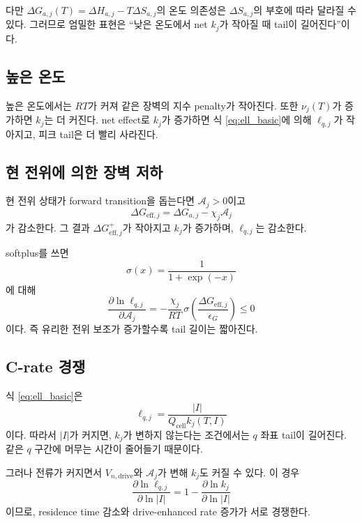 \documentclass[11pt]{article}
\newcommand{\cell}{\mathrm{cell}}
\newcommand{\drive}{\mathrm{drive}}
\newcommand{\eff}{\mathrm{eff}}
\begin{document}
다만 \(\Delta G_{a,j}(T)=\Delta H_{a,j}-T\Delta S_{a,j}\)의 온도 의존성은 \(\Delta S_{a,j}\)의 부호에 따라 달라질 수 있다. 그러므로 엄밀한 표현은 ``낮은 온도에서 net \(k_j\)가 작아질 때 tail이 길어진다''이다.

\subsection{높은 온도}

높은 온도에서는 \(RT\)가 커져 같은 장벽의 지수 penalty가 작아진다. 또한 \(\nu_j(T)\)가 증가하면 \(k_j\)는 더 커진다. net effect로 \(k_j\)가 증가하면 식 \eqref{eq:ell_basic}에 의해 \(\ell_{q,j}\)가 작아지고, 피크 tail은 더 빨리 사라진다.

\subsection{현 전위에 의한 장벽 저하}

현 전위 상태가 forward transition을 돕는다면 \(\mathcal A_j>0\)이고
\begin{equation}
\Delta G_{\eff,j}
=
\Delta G_{a,j}
-
\chi_j\mathcal A_j
\end{equation}
가 감소한다. 그 결과 \(\Delta G_{\eff,j}^{+}\)가 작아지고 \(k_j\)가 증가하며, \(\ell_{q,j}\)는 감소한다.

softplus를 쓰면
\begin{equation}
\sigma(x)
=
\frac{1}{1+\exp(-x)}
\end{equation}
에 대해
\begin{equation}
\boxed{
\frac{\partial \ln \ell_{q,j}}{\partial \mathcal A_j}
=
-
\frac{\chi_j}{RT}
\,\sigma\!\left(
\frac{\Delta G_{\eff,j}}{\epsilon_G}
\right)
\le0
}
\label{eq:dell_dA}
\end{equation}
이다. 즉 유리한 전위 보조가 증가할수록 tail 길이는 짧아진다.

\subsection{C-rate 경쟁}

식 \eqref{eq:ell_basic}은
\begin{equation}
\ell_{q,j}
=
\frac{|I|}{Q_{\cell}k_j(T,I)}
\end{equation}
이다. 따라서 \(|I|\)가 커지면, \(k_j\)가 변하지 않는다는 조건에서는 \(q\) 좌표 tail이 길어진다. 같은 \(q\) 구간에 머무는 시간이 줄어들기 때문이다.

그러나 전류가 커지면서 \(V_{n,\drive}\)와 \(\mathcal A_j\)가 변해 \(k_j\)도 커질 수 있다. 이 경우
\begin{equation}
\frac{\partial\ln \ell_{q,j}}{\partial\ln |I|}
=
1
-
\frac{\partial\ln k_j}{\partial\ln |I|}
\end{equation}
이므로, residence time 감소와 drive-enhanced rate 증가가 서로 경쟁한다.
\end{document}
